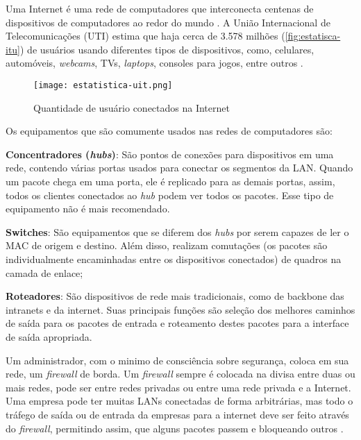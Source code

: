 Uma Internet é uma rede de computadores que interconecta centenas de dispositivos de computadores ao redor do mundo \cite{redes:kurose}. A União Internacional de Telecomunicações (UTI) estima que haja cerca de 3.578 milhões (\autoref{fig:estatisca-itu}) de usuários usando diferentes tipos de dispositivos, como, celulares, automóveis, \textit{webcams}, TVs, \textit{laptops}, consoles para jogos, entre outros \cite{estatistica:itu}.

\begin{figure}[!htb]
    \centering
    \caption{Quantidade de usuário conectados na Internet} 
    \texttt{[image: estatistica-uit.png]}
    \label{fig:estatisca-itu}
\end{figure}

Os equipamentos que são comumente usados nas redes de computadores são:

\begin{alineas}
\item \textbf{Concentradores (\textit{hubs})}: São pontos de conexões para dispositivos em uma rede, contendo várias portas usados para conectar os segmentos da LAN. Quando um pacote chega em uma porta, ele é replicado para as demais portas, assim, todos os clientes conectados ao \textit{hub} podem ver todos os pacotes. Esse tipo de equipamento não é mais recomendado.
\item \textbf{Switches}: São equipamentos que se diferem dos \textit{hubs} por serem capazes de ler o MAC de origem e destino. Além disso, realizam comutações (os pacotes são individualmente encaminhadas entre os dispositivos conectados) de quadros na camada de enlace;
\item \textbf{Roteadores}: São dispositivos de rede mais tradicionais, como de backbone das intranets e da internet. Suas principais funções são seleção dos melhores caminhos de saída para os pacotes de entrada e roteamento destes pacotes para a interface de saída apropriada.
\end{alineas}

Um administrador, com o minimo de consciência sobre segurança, coloca em sua rede, um \textit{firewall} de borda. Um \textit{firewall} sempre é colocada na divisa entre duas ou mais redes, pode ser entre redes privadas ou entre uma rede privada e a Internet. Uma empresa pode ter muitas LANs conectadas de forma arbitrárias, mas todo o tráfego de saída ou de entrada da empresas para a internet deve ser feito através do \textit{firewall}, permitindo assim, que alguns pacotes passem e bloqueando outros \cite{redesdecomputadores}.

